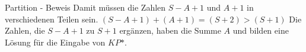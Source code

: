 \documentclass[12pt,donthandout,notes=dontshow,xcolor=table]{beamer}
\begin{document}
\begin{frame}{Partition - Beweis}
Damit müssen die Zahlen \(S - A + 1\) und \(A + 1\) in verschiedenen Teilen sein.
\((S - A + 1) + (A + 1) = (S + 2) > (S + 1)\)
Die Zahlen, die \(S - A + 1\) zu \(S + 1\) ergänzen, haben die Summe \(A\) und bilden eine Lösung für die Eingabe von \(KP\mbox{*}\).
\end{frame}

%



%


%
\end{document}
